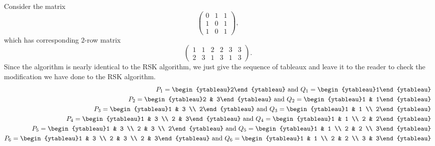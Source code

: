 	\begin{fex}
	Consider the matrix
	\[
	\begin{pmatrix}
		0 & 1 & 1 \\
		1 & 0 & 1 \\
		1 & 0 & 1
	\end{pmatrix},
	\]
	which has corresponding $2$-row matrix
	\[
	\begin{pmatrix}
		1 & 1 & 2 & 2 & 3 & 3 \\
		2 & 3 & 1 & 3 & 1 & 3
	\end{pmatrix}.
	\]
	Since the algorithm is nearly identical to the RSK algorithm, we just give the sequence of tableaux and leave it to the reader to check the modification we have done to the RSK algorithm.
	\begin{align*}
		P_1 = \begin{ytableau}2\end{ytableau} \text{ and } Q_1 = \begin{ytableau}1\end{ytableau} \\
		P_2 = \begin{ytableau}2 & 3\end{ytableau} \text{ and } Q_2 = \begin{ytableau}1 & 1\end{ytableau} \\
		P_3 = \begin{ytableau}1 & 3 \\ 2\end{ytableau} \text{ and } Q_3 = \begin{ytableau}1 & 1 \\ 2\end{ytableau} \\
		P_4 = \begin{ytableau}1 & 3 \\ 2 & 3\end{ytableau} \text{ and } Q_4 = \begin{ytableau}1 & 1 \\ 2 & 2\end{ytableau} \\
		P_5 = \begin{ytableau}1 & 3 \\ 2 & 3 \\ 2\end{ytableau} \text{ and } Q_5 = \begin{ytableau}1 & 1 \\ 2 & 2 \\ 3\end{ytableau} \\
		P_6 = \begin{ytableau}1 & 3 \\ 2 & 3 \\ 2 & 3\end{ytableau} \text{ and } Q_6 = \begin{ytableau}1 & 1 \\ 2 & 2 \\ 3 & 3\end{ytableau} \\
	\end{align*}
	\end{fex}

